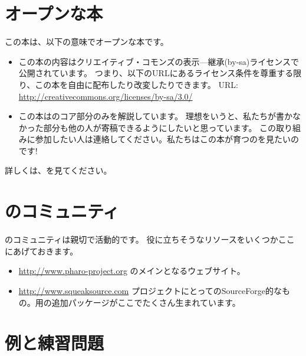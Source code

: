 \documentclass[a4paper,10pt,twoside]{book}
\begin{document}
\section*{オープンな本}

この本は、以下の意味でオープンな本です。

\begin{itemize}


\item	この本の内容はクリエイティブ・コモンズの表示—継承(by-sa)ライセンスで公開されています。
		つまり、以下のURLにあるライセンス条件を尊重する限り、この本を自由に配布したり改変したりできます。
		URL: 
		\url{http://creativecommons.org/licenses/by-sa/3.0/}


\item	この本は\pharo のコア部分のみを解説しています。
		理想をいうと、私たちが書かなかった部分も他の人が寄稿できるようにしたいと思っています。
		この取り組みに参加したい人は連絡してください。私たちはこの本が育つのを見たいのです!
		
\end{itemize}


詳しくは、\pbe を見てください。


\section*{ \pharo のコミュニティ}


\pharo のコミュニティは親切で活動的です。
役に立ちそうなリソースをいくつかここにあげておきます。

\begin{itemize}
\item \url{http://www.pharo-project.org} \pharo のメインとなるウェブサイト。


\item \url{http://www.squeaksource.com} \pharo プロジェクトにとってのSourceForge的なもの。\pharo 用の追加パッケージがここでたくさん生まれています。

\end{itemize}

\section*{例と練習問題}
\end{document}
